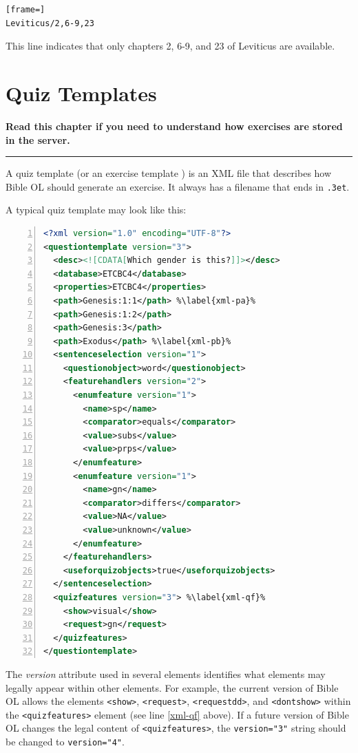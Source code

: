 \documentclass[11pt,oneside,a4paper]{memoir}
\newcommand*{\xml}[1]{\texttt{<#1>}}
\newcommand*{\xmla}[1]{\texttt{#1}} %
\newcommand*{\indexw}[1]{%
  #1%
  \index{#1}%
}
\begin{document}
\begin{lstlisting}[frame=]
Leviticus/2,6-9,23
\end{lstlisting}

This line indicates that only chapters 2, 6-9, and 23 of Leviticus are available.


\chapter{Quiz Templates}

\textbf{Read this chapter if you need to understand how exercises are stored in the server.}
\plainbreak{3}


A quiz template (or an \indexw{exercise template}) is an XML file that describes how Bible OL should
generate an exercise. It always has a filename that ends in \texttt{.3et}.

A typical quiz template may look like this:

\begin{lstlisting}[language=XML,numbers=left,caption=Quiz template sample,label=qtsample]
<?xml version="1.0" encoding="UTF-8"?>
<questiontemplate version="3">
  <desc><![CDATA[Which gender is this?]]></desc>
  <database>ETCBC4</database>
  <properties>ETCBC4</properties>
  <path>Genesis:1:1</path> %\label{xml-pa}%
  <path>Genesis:1:2</path>
  <path>Genesis:3</path>
  <path>Exodus</path> %\label{xml-pb}%
  <sentenceselection version="1">
    <questionobject>word</questionobject>
    <featurehandlers version="2">
      <enumfeature version="1">
        <name>sp</name>
        <comparator>equals</comparator>
        <value>subs</value>
        <value>prps</value>
      </enumfeature>
      <enumfeature version="1">
        <name>gn</name>
        <comparator>differs</comparator>
        <value>NA</value>
        <value>unknown</value>
      </enumfeature>
    </featurehandlers>
    <useforquizobjects>true</useforquizobjects>
  </sentenceselection>
  <quizfeatures version="3"> %\label{xml-qf}%
    <show>visual</show>
    <request>gn</request>
  </quizfeatures>
</questiontemplate>
\end{lstlisting}

The \emph{version} attribute used in several elements identifies what elements may legally appear
within other elements. For example, the current version of Bible OL allows the elements \xml{show},
\xml{request}, \xml{requestdd}, and \xml{dontshow} within the \xml{quizfeatures} element (see line
\ref{xml-qf} above). If a future version of Bible OL changes the legal content of
\xml{quizfeatures}, the \xmla{version="3"} string should be changed to \xmla{version="4"}.
\end{document}
